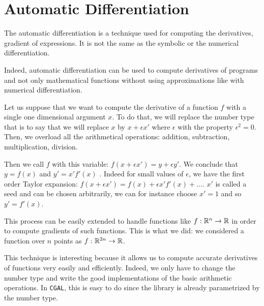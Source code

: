 \chapter{Automatic Differentiation}

The automatic differentiation is a technique used for computing the derivatives,
gradient of expressions. It is not the same as the symbolic or the numerical
differentiation.

Indeed, automatic differentiation can be used to compute derivatives of programs
and not only mathematical functions without using approximations like with
numerical differentiation.

Let us suppose that we want to compute the derivative of a function $ f $ with a
single one dimensional argument $ x $. To do that, we will replace the number
type that is to say that we will replace $ x $ by $ x + \epsilon x' $ where $
\epsilon $ with the property $ \epsilon^2 = 0 $. Then, we overload all the
arithmetical operations: addition, subtraction, multiplication, division.

Then we call $ f $ with this variable: $ f(x + \epsilon x') = y + \epsilon y'
$. We conclude that $ y = f(x) $ and $ y' = x' f'(x) $ . Indeed for small values
of $ \epsilon $, we have the first order Taylor expansion: $ f(x + \epsilon x') =
f(x) + \epsilon x' f'(x) + ... $. $ x' $ is called a seed and can be chosen
arbitrarily, we can for instance choose $ x ' = 1 $ and so $ y' = f'(x) $.

This process can be easily extended to handle functions like $ f : \mathbb{R}^n
\rightarrow \mathbb{R} $ in order to compute gradients of such functions. This is what
we did: we considered a function over $ n $ points as $ f : \mathbb{R}^{2n} \rightarrow
\mathbb{R} $.

This technique is interesting because it allows us to compute accurate
derivatives of functions very easily and efficiently. Indeed, we only have to
change the number type and write the good implementations of the basic
arithmetic operations.
In \texttt{CGAL}, this is easy to do since the library is already parametrized
by the number type.


